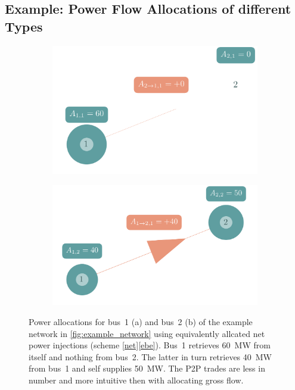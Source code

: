 \documentclass[11pt,twocolumn]{article}
\begin{document}
\subsection{Example: Power Flow Allocations of different Types}
\label{sec:example_plots}
\begin{figure}[h!]
    \begin{subfigure}[c]{\linewidth}
    \includegraphics[width=\linewidth]{example_allocation_bus1_net_ebe.png}
    \vspace{-40pt}
    \subcaption{}
    \label{fig:example_allocation_bus1_net_ebe}
    \end{subfigure}
    \begin{subfigure}[c]{\linewidth}
    \includegraphics[width=\linewidth]{example_allocation_bus2_net_ebe.png}
    \vspace{-40pt}
    \subcaption{}
    \label{fig:example_allocation_bus2_net_ebe}
    \end{subfigure}
    \caption{Power allocations for bus~1 (a) and bus~2 (b) of the example network in \cref{fig:example_network} using equivalently allcated net power injections (scheme \ref{net}\ref{ebe}). Bus~1 retrieves 60~MW from itself and nothing from bus~2. The latter in turn retrieves 40~MW from bus~1 and self supplies 50~MW. The P2P trades are less in number and more intuitive then with allocating gross flow.}
    \label{fig:example_allocation_net_ebe}
\end{figure}
\end{document}
